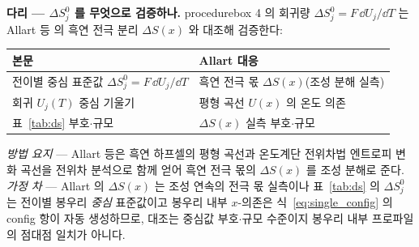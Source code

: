 
\begin{srcbox}
\textbf{다리 --- $\Delta S^0_j$ 를 무엇으로 검증하나.} procedurebox 4 의 회귀량 $\Delta S^0_j=F\,\dd
U_j/\dd T$ 는 Allart 등\cite{allart2018} 의 흑연 전극 분리 $\Delta S(x)$ 와 대조해 검증한다:
\begin{center}\footnotesize
\begin{tabular}{@{}ll@{}}
\hline
본문 & Allart\cite{allart2018} 대응 \\
\hline
전이별 중심 표준값 $\Delta S^0_j=F\,\dd U_j/\dd T$ & 흑연 전극 몫 $\Delta S(x)$(조성 분해 실측) \\
회귀 $U_j(T)$ 중심 기울기 & 평형 곡선 $U(x)$ 의 온도 의존 \\
표~\ref{tab:ds} 부호$\cdot$규모 & $\Delta S(x)$ 실측 부호$\cdot$규모 \\
\hline
\end{tabular}
\end{center}
\emph{방법 요지} --- Allart 등은 흑연 하프셀의 평형 곡선과 온도계단 전위차법 엔트로피 변화 곡선을 전위차
분석으로 함께 얻어 흑연 전극 몫의 $\Delta S(x)$ 를 조성 분해로 준다. \emph{가정 차} --- Allart 의 $\Delta S(x)$
는 조성 연속의 전극 몫 실측이나 표~\ref{tab:ds} 의 $\Delta S^0_j$ 는 전이별 봉우리 \emph{중심} 표준값이고
봉우리 내부 $x$-의존은 식~\eqref{eq:single_config} 의 config 항이 자동 생성하므로, 대조는 중심값
부호$\cdot$규모 수준이지 봉우리 내부 프로파일의 점대점 일치가 아니다.
\end{srcbox}
